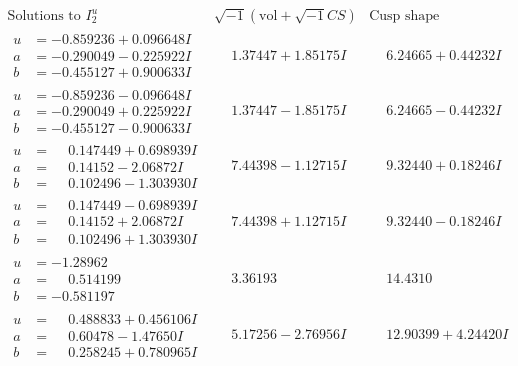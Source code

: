 \documentclass[1p]{elsarticle_modified}
\theoremstyle{definition}
\newcommand{\I}{\sqrt{-1}}
\begin{document}
$$\begin{array}{c|c|c}  
\text{Solutions to }I^u_{2}& \I (\text{vol} + \sqrt{-1}CS) & \text{Cusp shape}\\
 \hline 
\begin{aligned}
u &= -0.859236 + 0.096648 I \\
a &= -0.290049 - 0.225922 I \\
b &= -0.455127 + 0.900633 I\end{aligned}
 & \phantom{-}1.37447 + 1.85175 I & \phantom{-}6.24665 + 0.44232 I \\ \hline\begin{aligned}
u &= -0.859236 - 0.096648 I \\
a &= -0.290049 + 0.225922 I \\
b &= -0.455127 - 0.900633 I\end{aligned}
 & \phantom{-}1.37447 - 1.85175 I & \phantom{-}6.24665 - 0.44232 I \\ \hline\begin{aligned}
u &= \phantom{-}0.147449 + 0.698939 I \\
a &= \phantom{-}0.14152 - 2.06872 I \\
b &= \phantom{-}0.102496 - 1.303930 I\end{aligned}
 & \phantom{-}7.44398 - 1.12715 I & \phantom{-}9.32440 + 0.18246 I \\ \hline\begin{aligned}
u &= \phantom{-}0.147449 - 0.698939 I \\
a &= \phantom{-}0.14152 + 2.06872 I \\
b &= \phantom{-}0.102496 + 1.303930 I\end{aligned}
 & \phantom{-}7.44398 + 1.12715 I & \phantom{-}9.32440 - 0.18246 I \\ \hline\begin{aligned}
u &= -1.28962\phantom{ +0.000000I} \\
a &= \phantom{-}0.514199\phantom{ +0.000000I} \\
b &= -0.581197\phantom{ +0.000000I}\end{aligned}
 & \phantom{-}3.36193\phantom{ +0.000000I} & \phantom{-}14.4310\phantom{ +0.000000I} \\ \hline\begin{aligned}
u &= \phantom{-}0.488833 + 0.456106 I \\
a &= \phantom{-}0.60478 - 1.47650 I \\
b &= \phantom{-}0.258245 + 0.780965 I\end{aligned}
 & \phantom{-}5.17256 - 2.76956 I & \phantom{-}12.90399 + 4.24420 I \\ \hline\begin{aligned}

\end{aligned}
\end{array}$$
\end{document}
